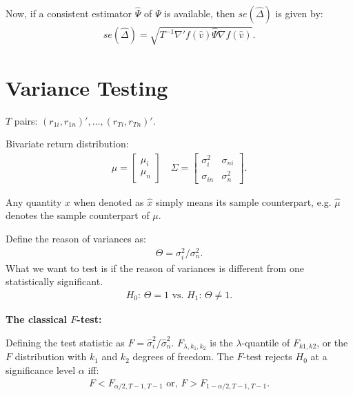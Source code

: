 \documentclass[12pt,oneside,a4paper]{article}
\begin{document}
Now, if a consistent estimator $\hat{\Psi}$ of $\Psi$ is available, then $se(\hat{\Delta})$ is given by:
\begin{align*}
se(\hat{\Delta}) = \sqrt{T^{-1} \nabla'f(\hat{v}) \hat{\Psi} \nabla f(\hat{v})}.
\end{align*}

\clearpage \section{Variance Testing}
\cite{lw2011-var}

$T$ pairs: $(r_{1i}, r_{1n})', \dots, (r_{Ti}, r_{Tn})'$.


Bivariate return distribution:
\begin{align*}
\mu=
\begin{bmatrix}
\mu_{i} \\ \mu_{n}
\end{bmatrix}
\quad
\Sigma=
\begin{bmatrix}
\sigma_{i}^2 & \sigma_{ni}
\\
\sigma_{in} & \sigma_{n}^2
\end{bmatrix}.
\end{align*}

Any quantity $x$ when denoted as $\hat{x}$ simply means its sample counterpart, e.g. $\hat{\mu}$ denotes the sample counterpart of $\mu$.

Define the reason of variances as:
\begin{align}
	\Theta=\sigma^2_{i}/\sigma^2_{n}.
\end{align}
What we want to test is if the reason of variances is different from one statistically significant.
\begin{align*}
	H_{0}: \,\Theta = 1
	\text{ vs. }
	H_{1}: \,\Theta \neq 1.
\end{align*}

\textbf{The classical $F$-test:}

Defining the test statistic as $F=\hat{\sigma}^2_{i}/\hat{\sigma}^2_{n}$.
$F_{\lambda, k_{1}, k_{2}}$ is the $\lambda$-quantile of $F_{k1, k2}$, or the $F$ distribution with $k_{1}$ and $k_{2}$ degrees of freedom.
The $F$-test rejects $H_{0}$ at a significance level $\alpha$ iff:
\begin{align*}
	F < F_{\alpha/2, T-1, T-1} 
	\text{ or, }
	F > F_{1-\alpha/2, T-1, T-1}.
\end{align*}
\end{document}
